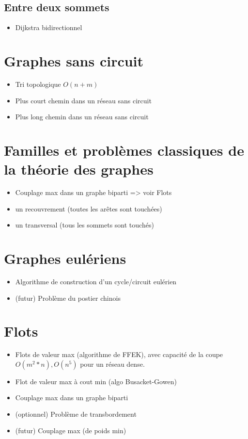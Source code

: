 \documentclass[french]{article}
\begin{document}
		\subsection{Entre deux sommets}
		\begin{itemize}
			\item Dijkstra bidirectionnel
		\end{itemize}
		
	\section{Graphes sans circuit}
	\begin{itemize}
		\item Tri topologique $O(n+m)$
		\item Plus court chemin dans un réseau sans circuit
		\item Plus long chemin dans un réseau sans circuit
	\end{itemize}
	
	\section{Familles et problèmes classiques de la théorie des graphes}
	\begin{itemize}
		\item Couplage max dans un graphe biparti => voir Flots
		\item un recouvrement (toutes les arêtes sont touchées)
		\item un transversal (tous les sommets sont touchés)
	\end{itemize}
	
	\section{Graphes eulériens}
	\begin{itemize}
		\item Algorithme de construction d'un cycle/circuit eulérien
		\item (futur) Problème du postier chinois
	\end{itemize}
	
	\section{Flots}
	\begin{itemize}
		\item Flots de valeur max (algorithme de FFEK), avec capacité de la coupe $O(m^2 * n), O(n^5)$ pour un réseau dense.
		\item Flot de valeur max à cout min (algo Busacket-Gowen)
		\item Couplage max dans un graphe biparti
		\item (optionnel) Problème de transbordement
		\item (futur) Couplage max (de poids min)
	\end{itemize}
			
\end{document}
